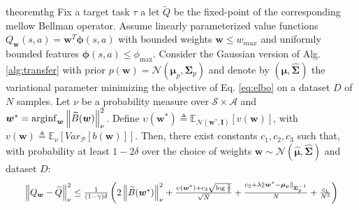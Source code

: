 \documentclass{article}
\newcommand{\arginf}{\operatornamewithlimits{arginf}}
\newcommand{\wt}[1]{\widetilde{#1}}
\newcommand{\wh}[1]{\widehat{#1}}
\newcommand{\norm}[1]{\left\lVert #1 \right\rVert}
\begin{document}
\begin{restatable}{theorem}{thg} \label{th:main-gaussian}
Fix a target task $\tau$ a let $\wt{Q}$ be the fixed-point of the corresponding mellow Bellman operator. Assume linearly parameterized value functions $Q_{\bm{w}}(s,a)=\bm{w}^T\bm{\phi}(s,a)$ with bounded weights $\bm{w}\leq w_{max}$ and uniformly bounded features $\bm{\phi}(s,a)\leq \phi_{\max}$. Consider the Gaussian version of Alg. \ref{alg:transfer} with prior $p(\bm{w}) =\mathcal{N}(\bm{\mu}_p,\bm{\Sigma}_p)$ and denote by $(\wh{\bm{\mu}},\wh{\bm{\Sigma}})$ the variational parameter minimizing the objective of Eq. \ref{eq:elbo} on a dataset $D$ of $N$ samples. Let $\nu$ be a probability measure over $\mathcal{S}\times\mathcal{A}$ and $\bm{w}^* = \arginf_{\bm{w}}\norm{\wt{B}(\bm{w})}_{\nu}^2$. Define $\upsilon(\bm{w}^*) \triangleq \mathbb{E}_{\mathcal{N}(\bm{w}^*,\bm{I})}\left[ v(\bm{w}) \right]$, with $v(\bm{w}) \triangleq \mathbb{E}_{\nu}\left[Var_{\mathcal{P}}\left[b(\bm{w})\right]\right]$. Then, there exist constants $c_1,c_2,c_3$ such that, with probability at least $1-2\delta$ over the choice of weights $\bm{w} \sim \mathcal{N}(\wh{\bm{\mu}},\wh{\bm{\Sigma}})$ and dataset $D$:
\begin{equation}
\resizebox{0.93\textwidth}{!}{$
\norm{Q_{\bm{w}} - \wt{Q}}_{\nu}^2 \leq \frac{1}{(1-\gamma)\delta}\left(2\norm{\wt{B}(\bm{w}^{*})}_{\nu}^2 + \frac{\upsilon(\bm{w}^*) + c_3\sqrt{\log\frac{2}{\delta}}}{\sqrt{N}} + \frac{c_2 + \lambda\norm{\bm{w}^* - \bm{\mu}_p}_{\bm{\Sigma}_p^{-1}}}{N} + \frac{c_1}{N^2}\right)$}
\end{equation}
\end{restatable}
\end{document}
